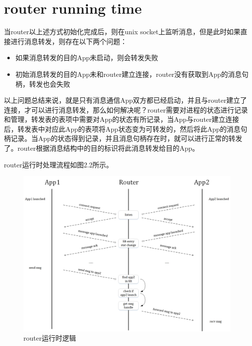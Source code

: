 \documentclass[a4paper,11pt,oneside]{ctexbook}
\begin{document}
\section{router running time}
当router以上述方式初始化完成后，则在unix socket上监听消息，但是此时如果直接进行消息转发，则存在以下两个问题：

\begin{itemize}
  \item{如果消息转发的目的App未启动，则会转发失败}
  \item{初始消息转发的目的App未和router建立连接，router没有获取到App的消息句柄，转发也会失败}
\end{itemize}

以上问题总结来说，就是只有消息通信App双方都已经启动，并且与router建立了连接，才可以进行消息转发，那么如何解决呢？router需要对进程的状态进行记录和管理，转发表的表项中需要对App的状态有所记录，当App与router建立连接后，转发表中对应此App的表项将App状态变为可转发的，然后将此App的消息句柄记录。当App的状态得到记录，并且消息句柄存在时，就可以进行正常的转发了。router根据消息结构中的目的标识将此消息转发给目的App。

router运行时处理流程如图2.2所示。

\begin{figure}[ht]
    \centering
    \includegraphics[width=1\textwidth]{image/message-router-04.jpg}
    \caption{router运行时逻辑}
\end{figure}
\end{document}
